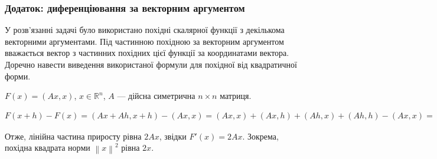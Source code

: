 \documentclass[10pt,pdf]{beamer}
\newcommand{\norm}[1]{\left\lVert#1\right\rVert} %
\newcommand{\dotprod}[2]{\left(#1, #2\right)} %
\begin{document}
    \begin{frame}
        \frametitle{Додаток: диференціювання за векторним аргументом}
        У розв'язанні задачі було використано похідні скалярної функції з
        декількома векторними аргументами. Під частинною похідною
        за векторним аргументом вважається вектор з частинних похідних
        цієї функції за координатами вектора. Доречно навести виведення використаної
        формули для похідної від квадратичної форми.

        $F(x) = \dotprod{Ax}{x}$, $x \in \mathbb{R}^n$, $A$ --- дійсна симетрична $n\times n$ матриця.

        $F(x+h) - F(x) = \dotprod{Ax+Ah}{x+h} - \dotprod{Ax}{x} =
        \dotprod{Ax}{x} + \dotprod{Ax}{h} + \dotprod{Ah}{x} + \dotprod{Ah}{h} - \dotprod{Ax}{x} =
        \left[ A = A^T \right] = \dotprod{2Ax}{h} + \dotprod{Ah}{h}$

        Отже, лінійна частина приросту рівна $2Ax$, звідки $F'(x) = 2Ax$.
        Зокрема, похідна квадрата норми $\norm{x}^2$ рівна $2x$.
    \end{frame}
\end{document}
